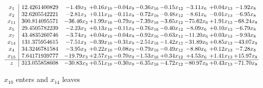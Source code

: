 \documentclass[9pt]{article}
\begin{document}
 \[\begin{array}{c| c c@{\hskip 2pt} c@{\hskip 2pt} c@{\hskip 2pt} c@{\hskip 2pt} c@{\hskip 2pt} c@{\hskip 2pt} c@{\hskip 2pt} c@{\hskip 2pt} }
 x_{1}   &  12.4261400829 & -1.49 x_{3} & +  0.16 x_{10} & -0.04 x_{9} & -0.36 x_{16} & -0.15 x_{12} & -3.11 x_{6} & +  0.04 x_{13} & -1.92 x_{8}\\
 x_{2}   &  32.6205542221 & -2.81 x_{3} & +  0.11 x_{10} & -0.11 x_{9} & -0.72 x_{16} & -0.48 x_{12} & -8.61 x_{6} & -0.01 x_{13} & -6.95 x_{8}\\
 x_{11}   &  300.814095571 & -36.46 x_{3} & +  1.99 x_{10} & -0.79 x_{9} & -7.39 x_{16} & -3.65 x_{12} & -75.62 x_{6} & +  1.91 x_{13} & -68.24 x_{8}\\
 x_{5}   &  29.4505782239 & -2.23 x_{3} & +  0.13 x_{10} & -0.11 x_{9} & -0.76 x_{16} & -0.40 x_{12} & -8.09 x_{6} & +  0.10 x_{13} & -6.79 x_{8}\\
 x_{7}   &  43.4835260746 & -3.74 x_{3} & +  0.04 x_{10} & -0.04 x_{9} & -0.92 x_{16} & -0.63 x_{12} & -11.20 x_{6} & +  0.03 x_{13} & -9.93 x_{8}\\
 x_{14}   &  131.375954615 & -7.51 x_{3} & -0.39 x_{10} & -0.31 x_{9} & -2.51 x_{16} & -1.42 x_{12} & -31.89 x_{6} & +  0.85 x_{13} & -43.07 x_{8}\\
 x_{4}   &  34.3246781584 & -3.95 x_{3} & +  0.22 x_{10} & -0.08 x_{9} & -0.79 x_{16} & -0.49 x_{12} & -8.80 x_{6} & +  0.12 x_{13} & -7.28 x_{8}\\
 x_{15}   &  7.64171939777 & -19.79 x_{3} & +  2.57 x_{10} & -0.70 x_{9} & -1.53 x_{16} & +  0.34 x_{12} & +  4.53 x_{6} & +  1.41 x_{13} & + 15.97 x_{8}\\
\hline
z    &  313.055858608 & -30.83 x_{3} & +  0.51 x_{10} & -0.30 x_{9} & -6.35 x_{16} & -4.72 x_{12} & -80.97 x_{6} & +  0.43 x_{13} & -71.70 x_{8}\\
\end{array}\]


 $ x_{10} $ enters and $ x_{14} $ leaves 
\end{document}
